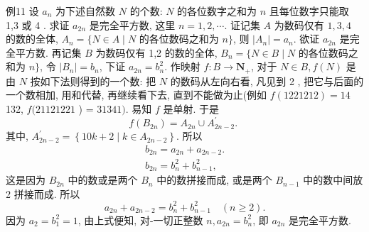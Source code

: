 例11 设 $a_n$ 为下述自然数 $N$ 的个数: $N$ 的各位数字之和为 $n$ 且每位数字只能取 1,3 或 4 . 求证 $a_{2 n}$ 是完全平方数, 这里 $n=1,2, \cdots$.
证记集 $A$ 为数码仅有 $1,3,4$ 的数的全体, $A_n=\{N \in A \mid N$ 的各位数码之和为 $n\}$, 则 $\left|A_n\right|=a_n$. 欲证 $a_{2 n}$ 是完全平方数.
再记集 $B$ 为数码仅有 1,2 的数的全体, $B_n=\{N \in B \mid N$ 的各位数码之和为 $n\}$, 令 $\left|B_n\right|=b_n$, 下证 $a_{2 n}=b_n^2$.
作映射 $f: B \rightarrow \mathbf{N}_{+}$, 对于 $N \in B, f(N)$ 是由 $N$ 按如下法则得到的一个数: 把 $N$ 的数码从左向右看, 凡见到 2 , 把它与后面的一个数相加, 用和代替, 再继续看下去, 直到不能做为止(例如 $f(1221212)=14$ 132, $f(21121221$ ) = $31341)$. 易知 $f$ 是单射.
于是
$$
f\left(B_{2 n}\right)=A_{2 n} \cup A_{2 n-2}^{\prime} \text {. }
$$
其中, $A_{2 n-2}^{\prime}=\left\{10 k+2 \mid k \in A_{2 n-2}\right\}$. 所以
$$
\begin{gathered}
b_{2 n}=a_{2 n}+a_{2 n-2} . \\
b_{2 n}=b_n^2+b_{n-1}^2,
\end{gathered}
$$
这是因为 $B_{2 n}$ 中的数或是两个 $B_n$ 中的数拼接而成, 或是两个 $B_{n-1}$ 中的数中间放 2 拼接而成.
所以
$$
a_{2 n}+a_{2 n-2}=b_n^2+b_{n-1}^2 \quad(n \geqslant 2) .
$$
因为 $a_2=b_1^2=1$, 由上式便知, 对-一切正整数 $n, a_{2 n}=b_n^2$, 即 $a_{2 n}$ 是完全平方数.


